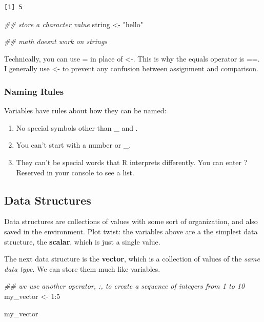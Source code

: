 \documentclass[
  letterpaper,
  DIV=11,
  numbers=noendperiod]{scrreprt}
\newenvironment{Shaded}{\begin{snugshade}}{\end{snugshade}}
\newcommand{\DecValTok}[1]{\textcolor[rgb]{0.68,0.00,0.00}{#1}}
\newcommand{\DocumentationTok}[1]{\textcolor[rgb]{0.37,0.37,0.37}{\textit{#1}}}
\newcommand{\NormalTok}[1]{\textcolor[rgb]{0.00,0.23,0.31}{#1}}
\newcommand{\OtherTok}[1]{\textcolor[rgb]{0.00,0.23,0.31}{#1}}
\newcommand{\SpecialCharTok}[1]{\textcolor[rgb]{0.37,0.37,0.37}{#1}}
\newcommand{\StringTok}[1]{\textcolor[rgb]{0.13,0.47,0.30}{#1}}
\providecommand{\tightlist}{%
  \setlength{\itemsep}{0pt}\setlength{\parskip}{0pt}}\usepackage{longtable,booktabs,array}
\begin{document}
\begin{verbatim}
[1] 5
\end{verbatim}

\begin{Shaded}
\begin{Highlighting}[]
\DocumentationTok{\#\# store a character value}
\NormalTok{string }\OtherTok{\textless{}{-}} \StringTok{"hello"}

\DocumentationTok{\#\# math doesn\textquotesingle{}t work on strings}
\end{Highlighting}
\end{Shaded}

Technically, you can use = in place of \textless-. This is why the
equals operator is ==. I generally use \textless- to prevent any
confusion between assignment and comparison.

\hypertarget{naming-rules}{%
\subsubsection{Naming Rules}\label{naming-rules}}

Variables have rules about how they can be named:

\begin{enumerate}
\def\labelenumi{\arabic{enumi}.}
\tightlist
\item
  No special symbols other than \_ and .
\item
  You can't start with a number or \_.
\item
  They can't be special words that R interprets differently. You can
  enter ?Reserved in your console to see a list.
\end{enumerate}

\hypertarget{data-structures}{%
\subsection{Data Structures}\label{data-structures}}

Data structures are collections of values with some sort of
organization, and also saved in the environment. Plot twist: the
variables above are a the simplest data structure, the \textbf{scalar},
which is just a single value.

The next data structure is the \textbf{vector}, which is a collection of
values of the \emph{same data type}. We can store them much like
variables.

\begin{Shaded}
\begin{Highlighting}[]
\DocumentationTok{\#\# we use another operator, :, to create a sequence of integers from 1 to 10}
\NormalTok{my\_vector }\OtherTok{\textless{}{-}} \DecValTok{1}\SpecialCharTok{:}\DecValTok{5}

\NormalTok{my\_vector}
\end{Highlighting}
\end{Shaded}
\end{document}
